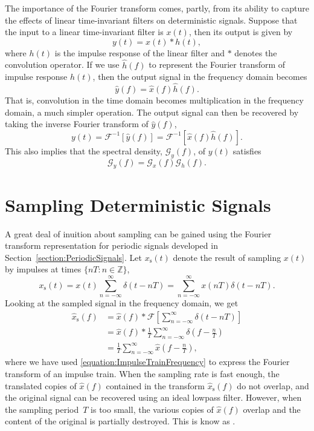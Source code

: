 The importance of the Fourier transform comes, partly, from its ability to capture the effects of linear time-invariant filters on deterministic signals.
Suppose that the input to a linear time-invariant filter is $x(t)$, then its output is given by
\begin{equation*}
y(t) = x(t) \ast h(t),
\end{equation*}
where $h(t)$ is the impulse response of the linear filter and $\ast$ denotes the convolution operator.
If we use $\hat{h}(f)$ to represent the Fourier transform of impulse response $h(t)$, then the output signal in the frequency domain becomes
\begin{equation*}
\hat{y}(f) = \hat{x}(f) \hat{h}(f) .
\end{equation*}
That is, convolution in the time domain becomes multiplication in the frequency domain, a much simpler operation.
The output signal can then be recovered by taking the inverse Fourier transform of $\hat{y}(f)$,
\begin{equation*}
y(t) = \mathcal{F}^{-1} [ \hat{y}(f) ] = \mathcal{F}^{-1} [ \hat{x}(f) \hat{h}(f) ] .
\end{equation*}
This also implies that the spectral density, $\mathcal{G}_y(f)$, of $y(t)$ satisfies
\[ \mathcal{G}_y(f) = \mathcal{G}_x(f) \mathcal{G}_h(f). \]

\section{Sampling Deterministic Signals}

A great deal of inuition about sampling can be gained using the Fourier transform representation for periodic signals developed in Section~\ref{section:PeriodicSignals}.
Let $x_{\mathrm{s}}(t)$ denote the result of sampling $x(t)$ by impulses at times $\{ nT : n \in \mathbb{Z} \}$,
\begin{equation*}
x_{\mathrm{s}}(t) = x(t) \sum_{n=-\infty}^{\infty} \delta(t-nT)
= \sum_{n=-\infty}^{\infty} x(nT) \delta(t-nT).
\end{equation*}
Looking at the sampled signal in the frequency domain, we get
\begin{equation*}\begin{split}
\hat{x}_{\mathrm{s}}(f) &= \hat{x}(f) \ast \mathcal{F} \left[ \sum_{n=-\infty}^{\infty} \delta(t-nT) \right] \\
&= \hat{x}(f) \ast \frac{1}{T} \sum_{n=-\infty}^{\infty} \delta \left( f-\frac{n}{T} \right) \\
&= \frac{1}{T} \sum_{n=-\infty}^{\infty} \hat{x} \left( f - \frac{n}{T} \right) ,\end{split}\end{equation*}
where we have used \eqref{equation:ImpulseTrainFrequency} to express the Fourier transform of an impulse train.
When the sampling rate is fast enough, the translated copies of $\hat{x}(f)$ contained in the transform $\hat{x}_{\mathrm{s}}(f)$ do not overlap, and the original signal can be recovered using an ideal lowpass filter.
However, when the sampling period~$T$ is too small, the various copies of $\hat{x}(f)$ overlap and the content of the original is partially destroyed.
This is know as .

